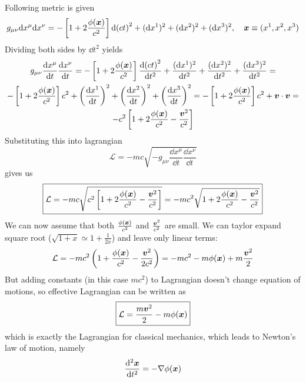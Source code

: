 \problem
Following metric is given
%
\begin{equation}
    g_{\mu\nu}\dd x^\mu \dd x^\nu =
    -\left[1+2\frac{\phi(\boldsymbol{x})}{c^2}\right] \dd(ct)^2 +
    (\dd x^1)^2 + (\dd x^2)^2 + (\dd x^3)^2, \quad \boldsymbol{x} \equiv (x^1,x^2,x^3)
\end{equation}
%
Dividing both sides by $\dd t^2$ yields
%
\begin{multline}
    g_{\mu\nu}\frac{\dd x^\mu}{\dd t} \frac{\dd x^\nu}{\dd t} =
    -\left[1+2\frac{\phi(\boldsymbol{x})}{c^2}\right] \frac{\dd(ct)^2}{\dd t^2} +
    \frac{(\dd x^1)^2}{\dd t^2} + \frac{(\dd x^2)^2}{\dd t^2} + \frac{(\dd x^3)^2}{\dd t^2} = \\
    -\left[1+2\frac{\phi(\boldsymbol{x})}{c^2}\right] c^2 +
    \left(\frac{\dd x^1}{\dd t}\right)^2 +
    \left(\frac{\dd x^2}{\dd t}\right)^2 +
    \left(\frac{\dd x^3}{\dd t}\right)^2 =
    -\left[1+2\frac{\phi(\boldsymbol{x})}{c^2}\right] c^2 +
    \boldsymbol{v}\cdot\boldsymbol{v} = \\
    -c^2 \left[1+2\frac{\phi(\boldsymbol{x})}{c^2} -
        \frac{\boldsymbol{v}^2}{c^2}\right]
\end{multline}
%
Substituting this into lagrangian
%
\begin{equation}
    \mathcal{L} = -mc\sqrt{-g_{\mu\nu}\frac{\dd x^\mu}{\dd t}\frac{\dd x^\nu}{\dd t}}
\end{equation}
%
gives us
%
\begin{equation}
    \boxed{\mathcal{L} = -mc \sqrt{c^2 \left[1+2\frac{\phi(\boldsymbol{x})}{c^2} -
            \frac{\boldsymbol{v}^2}{c^2}\right]} =
    -mc^2\sqrt{1+2\frac{\phi(\boldsymbol{x})}{c^2} -
        \frac{\boldsymbol{v}^2}{c^2}}}
\end{equation}
%
We can now assume that both $\frac{\phi(\boldsymbol{x})}{c^2}$ and
$\frac{\boldsymbol{v}^2}{c^2}$ are small. We can taylor expand square root ($\sqrt{1+x}
\simeq 1 + \frac{1}{2x}$) and leave only linear terms:
%
\begin{equation}
    \mathcal{L} = -mc^2 \left(1 + \frac{\phi(\boldsymbol{x})}{c^2} - \frac{\boldsymbol{v}^2}{2c^2}\right) = 
    -mc^2 - m\phi(\boldsymbol{x}) + m\frac{\boldsymbol{v}^2}{2}
\end{equation}
%
But adding constants (in this case $mc^2$) to Lagrangian doesn't change equation
of motions, so effective Lagrangian can be written as 
%
\begin{equation}
    \boxed{\mathcal{L} = \frac{m\boldsymbol{v}^2}{2} - m\phi(\boldsymbol{x})}
\end{equation}
%
which is exactly the Lagrangian for classical mechanics, which leads to Newton's
law of motion, namely 
%
\begin{equation}
    \frac{\dd^2 \boldsymbol{x}}{\dd t^2} = - \nabla\phi(\boldsymbol{x})
\end{equation}